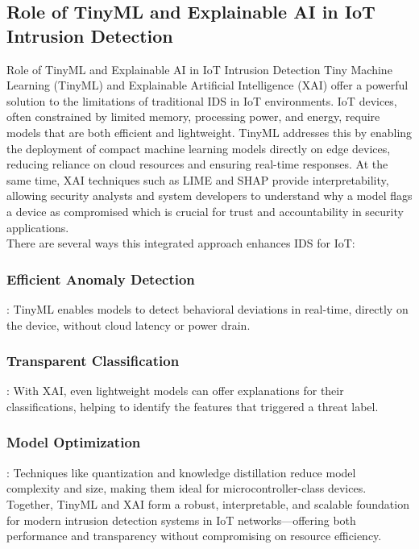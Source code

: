 \documentclass[conference,letterpaper]{IEEEtran}
\begin{document}
\subsection{Role of TinyML and Explainable AI in IoT Intrusion Detection}
Role of TinyML and Explainable AI in IoT Intrusion Detection
Tiny Machine Learning (TinyML) and Explainable Artificial Intelligence (XAI) offer a powerful solution to the limitations of traditional IDS in IoT environments. IoT devices, often constrained by limited memory, processing power, and energy, require models that are both efficient and lightweight. TinyML addresses this by enabling the deployment of compact machine learning models directly on edge devices, reducing reliance on cloud resources and ensuring real-time responses. At the same time, XAI techniques such as LIME and SHAP provide interpretability, allowing security analysts and system developers to understand why a model flags a device as compromised which is crucial for trust and accountability in security applications.
~\\
There are several ways this integrated approach enhances IDS for IoT:
~\\
\subsubsection{Efficient Anomaly Detection}: TinyML enables models to detect behavioral deviations in real-time, directly on the device, without cloud latency or power drain.
~\\
\subsubsection {Transparent Classification}: With XAI, even lightweight models can offer explanations for their classifications, helping to identify the features that triggered a threat label.
~\\
\subsubsection {Model Optimization}: Techniques like quantization and knowledge distillation reduce model complexity and size, making them ideal for microcontroller-class devices.
~\\

Together, TinyML and XAI form a robust, interpretable, and scalable foundation for modern intrusion detection systems in IoT networks—offering both performance and transparency without compromising on resource efficiency.
\end{document}
